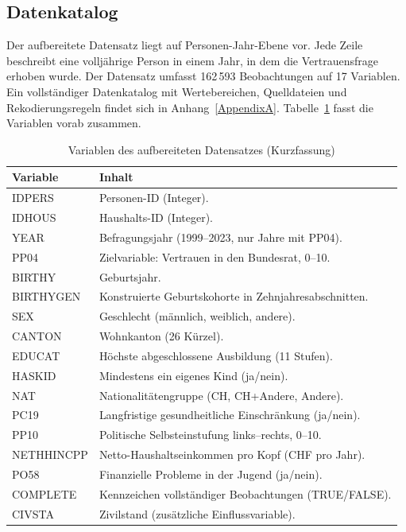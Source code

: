 \subsection{Datenkatalog}
\label{subsec:datenkatalog}

Der aufbereitete Datensatz liegt auf Personen-Jahr-Ebene vor. Jede Zeile beschreibt
eine volljährige Person in einem Jahr, in dem die Vertrauensfrage erhoben wurde. Der
Datensatz umfasst 162\,593 Beobachtungen auf 17 Variablen. Ein vollständiger
Datenkatalog mit Wertebereichen, Quelldateien und Rekodierungsregeln findet sich in
Anhang~\ref{AppendixA}. Tabelle~\ref{tab:datenkatalog-kurz} fasst die Variablen
vorab zusammen.

\begin{table}[h]
\centering
\caption{Variablen des aufbereiteten Datensatzes (Kurzfassung)}
\label{tab:datenkatalog-kurz}
\begin{tabularx}{\textwidth}{lX}
\toprule
Variable & Inhalt \\
\midrule
IDPERS     & Personen-ID (Integer). \\
IDHOUS     & Haushalts-ID (Integer). \\
YEAR       & Befragungsjahr (1999--2023, nur Jahre mit PP04). \\
PP04       & Zielvariable: Vertrauen in den Bundesrat, 0--10. \\
BIRTHY     & Geburtsjahr. \\
BIRTHYGEN  & Konstruierte Geburtskohorte in Zehnjahresabschnitten. \\
SEX        & Geschlecht (männlich, weiblich, andere). \\
CANTON     & Wohnkanton (26 Kürzel). \\
EDUCAT     & Höchste abgeschlossene Ausbildung (11 Stufen). \\
HASKID     & Mindestens ein eigenes Kind (ja/nein). \\
NAT        & Nationalitätengruppe (CH, CH+Andere, Andere). \\
PC19       & Langfristige gesundheitliche Einschränkung (ja/nein). \\
PP10       & Politische Selbsteinstufung links--rechts, 0--10. \\
NETHHINCPP & Netto-Haushaltseinkommen pro Kopf (CHF pro Jahr). \\
PO58       & Finanzielle Probleme in der Jugend (ja/nein). \\
COMPLETE   & Kennzeichen vollständiger Beobachtungen (TRUE/FALSE). \\
CIVSTA     & Zivilstand (zusätzliche Einflussvariable). \\
\bottomrule
\end{tabularx}
\end{table}

